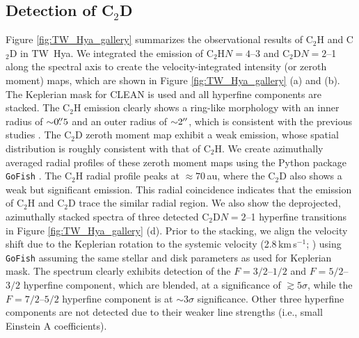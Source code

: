 \documentclass[linenumbers, twocolumn, times]{aastex631}
\newcommand{\CCH}{C$_2$H\xspace}
\newcommand{\CCD}{C$_2$D\xspace}
\begin{document}
\subsection{Detection of \CCD}
Figure \ref{fig:TW_Hya_gallery} summarizes the observational results of \CCH and \CCD in TW~Hya. We integrated the emission of \CCH $N=4$--3 and \CCD $N=2$--1 along the spectral axis to create the velocity-integrated intensity (or zeroth moment) maps, which are shown in Figure \ref{fig:TW_Hya_gallery} (a) and (b). The Keplerian mask for CLEAN is used and all hyperfine components are stacked. The \CCH emission clearly shows a ring-like morphology with an inner radius of ${\sim}0\mbox{$.\!\!^{\prime\prime}$}5$ and an outer radius of ${\sim}2\mbox{$^{\prime\prime}$}$, which is consistent with the previous studies \citep{Bergin2016, Bergin2024}. The \CCD zeroth moment map exhibit a weak emission, whose spatial distribution is roughly consistent with that of \CCH. We create azimuthally averaged radial profiles of these zeroth moment maps using the Python package \texttt{GoFish} \citep{GoFish}. The \CCH radial profile peaks at ${\approx}70$\,au, where the \CCD also shows a weak but significant emission. This radial coincidence indicates that the emission of \CCH and \CCD trace the similar radial region. We also show the deprojected, azimuthally stacked spectra of three detected \CCD $N=2$--1 hyperfine transitions in Figure \ref{fig:TW_Hya_gallery} (d). Prior to the stacking, we align the velocity shift due to the Keplerian rotation to the systemic velocity (2.8\,km\,s$^{-1}$; \citealt{Teague2022}) using \texttt{GoFish} \citep{GoFish} assuming the same stellar and disk parameters as used for Keplerian mask. The spectrum clearly exhibits  detection of the $F=3/2$--$1/2$ and $F=5/2$--$3/2$ hyperfine component, which are blended, at a significance of ${\gtrsim}5\sigma$, while the $F=7/2$--$5/2$ hyperfine component is at ${\sim}3\sigma$ significance. Other three hyperfine components are not detected due to their weaker line strengths (i.e., small Einstein A coefficients). 

\begin{figure*}
\caption{Velocity-integrated intensity (zeroth moment) map of \CCH $N=4$--3 (a) and \CCD $N=2$--1 (b) stacked over all hyperfine lines. In each panel, the 0 synthesized beam and a 50 au scale bar are shown in the lower left and lower right, respectively. The panel (c) shows the azimuthally averaged radial profiles of the \CCH and \CCD emission. The shaded regions indicate uncertainties of [1, 2, 3]$\sigma$. The panel (d) shows the deprojected, azimuthally stacked spectrum of \CCD $N=2$--1 over an annulus with an inner radius of 0 and an outer radius of 1. While the observations cover six hyperfine lines of \CCD, here only the detected ones among them ($F=3/2$--$1/2$, $F=5/2$--$3/2$, and $F=7/2$--$5/2$, where the first two are blended) are shown. The LSRK velocity is with respect to the rest frequency of the $F=7/2$--$5/2$ transition, where the systemic velocity of TW~Hya is 2.8\,km\,s$^{-1}$ \citep{Teague2022}.}
\label{fig:TW_Hya_gallery}
\end{figure*}
\end{document}
